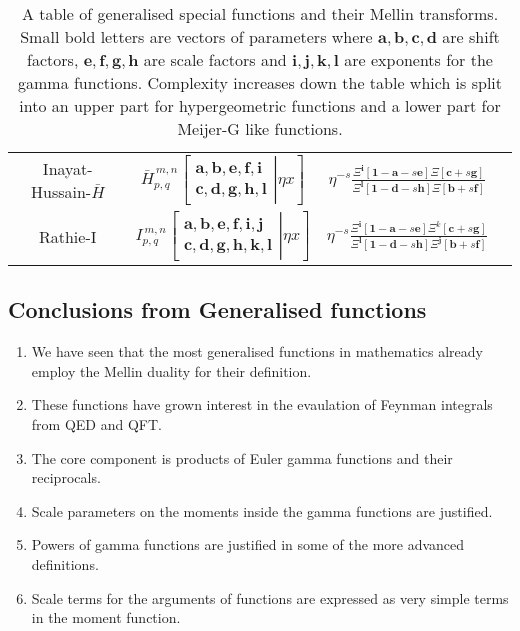 \documentclass[journal=jcisd8,manuscript=article,layout=onecolumn,pdftex,floatfix,amsmath,amssymb,10pt]{achemso}
\begin{document}
\begin{table}
\begin{tabular}{|c|c|c|c|}
Inayat-Hussain-$\bar{H}$  & $\bar{H}_{p,q}^{\,m,n} \!\left[\left. \begin{matrix}
\mathbf{a},\mathbf{b},\mathbf{e,f,i} \\
\mathbf{c},\mathbf{d},\mathbf{g,h,l} \end{matrix} \right| \eta x \right]$ & $\eta^{-s}\frac{\Xi^{\mathbf{i}}[\mathbf{1-a}-s\mathbf{e}]\Xi[\mathbf{c}+s\mathbf{g}]}{\Xi^{\mathbf{l}}[\mathbf{1-d}-s\mathbf{h}] \Xi[\mathbf{b} + s \mathbf{f}]}$ &\\
Rathie-I & $I_{p,q}^{\,m,n} \!\left[\left. \begin{matrix}
\mathbf{a},\mathbf{b},\mathbf{e,f,i,j} \\
\mathbf{c},\mathbf{d},\mathbf{g,h,k,l} \end{matrix} \right| \eta x \right]$ & $\eta^{-s}\frac{\Xi^{\mathbf{i}}[\mathbf{1-a}-s\mathbf{e}]\Xi^{k}[\mathbf{c}+s\mathbf{g}]}{\Xi^{\mathbf{l}}[\mathbf{1-d}-s\mathbf{h}] \Xi^{\mathbf{j}}[\mathbf{b} + s \mathbf{f}]}$ &\\
\hline
\end{tabular}
\caption{A table of generalised special functions and their Mellin transforms. Small bold letters are vectors of parameters where $\mathbf{a,b,c,d}$ are shift factors, $\mathbf{e,f,g,h}$ are scale factors and $\mathbf{i,j,k,l}$ are exponents for the gamma functions. Complexity increases down the table which is split into an upper part for hypergeometric functions and a lower part for Meijer-G like functions.}
\end{table}


\subsection{Conclusions from Generalised functions}
\begin{enumerate}
\item We have seen that the most generalised functions in mathematics already employ the Mellin duality for their definition.
\item These functions have grown interest in the evaulation of Feynman integrals from QED and QFT.
\item The core component is products of Euler gamma functions and their reciprocals.
\item Scale parameters on the moments inside the gamma functions are justified.
\item Powers of gamma functions are justified in some of the more advanced definitions.
\item Scale terms for the arguments of functions are expressed as very simple terms in the moment function.
\end{enumerate}
\end{document}
